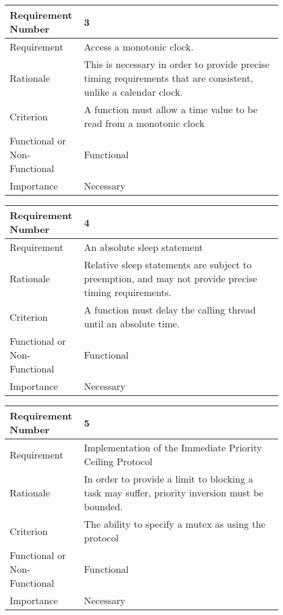 \begin{table}[!htbp]
\centering
\begin{tabular}{|L{0.2\linewidth}|L{0.7\linewidth}|}
\hline
Requirement Number & 3 \\ \hline
Requirement & Access a monotonic clock. \\ \hline
Rationale      & This is necessary in order to provide precise timing requirements 
                that are consistent, unlike a calendar clock. \\ \hline
Criterion      & A function must allow a time value to be read from a monotonic clock \\ \hline
Functional or Non-Functional & Functional \\ \hline
Importance     & Necessary \\ \hline
\end{tabular}
\end{table}
\begin{table}[!htbp]
\centering
\begin{tabular}{|L{0.2\linewidth}|L{0.7\linewidth}|}
\hline
Requirement Number & 4 \\ \hline
Requirement & An absolute sleep statement \\ \hline
Rationale      & Relative sleep statements are subject to preemption, and may not 
                provide precise timing requirements. \\ \hline
Criterion      & A function must delay the calling thread until an absolute time. \\ \hline
Functional or Non-Functional & Functional \\ \hline
Importance     & Necessary \\ \hline
\end{tabular}
\end{table}
\begin{table}[!htbp]
\centering
\begin{tabular}{|L{0.2\linewidth}|L{0.7\linewidth}|}
\hline
Requirement Number & 5 \\ \hline
Requirement & Implementation of the Immediate Priority Ceiling Protocol \\ \hline
Rationale      & In order to provide a limit to blocking a task may suffer, priority 
                inversion must be bounded. \\ \hline
Criterion      & The ability to specify a mutex as using the protocol\\ \hline
Functional or Non-Functional & Functional \\ \hline
Importance     & Necessary \\ \hline
\end{tabular}
\end{table}

